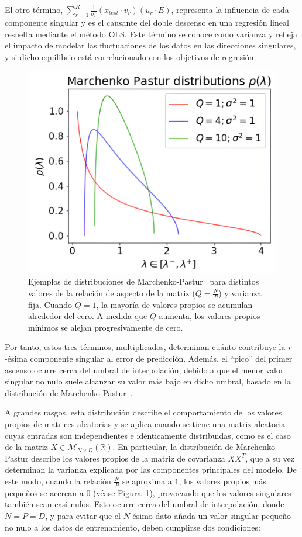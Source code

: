 El otro término, $\sum_{r=1}^{R}\frac{1}{\sigma_r}(x_{test} \cdot v_r)(u_r \cdot E)$, representa la influencia de cada componente singular y es el causante del doble descenso en una regresión lineal resuelta mediante el método OLS. Este término se conoce como varianza y refleja el impacto de modelar las fluctuaciones de los datos en las direcciones singulares, y si dicho equilibrio está correlacionado con los objetivos de regresión.

\begin{figure}[h]
    \centering
    \includegraphics[width=0.5\linewidth]{img/marchenku-pastor.png}
    \caption[Ejemplos de distribuciones de Marchenko-Pastur~\cite{Charles2018}.]{Ejemplos de distribuciones de Marchenko-Pastur~\cite{Charles2018} para distintos valores de la relación de aspecto de la matriz ($Q = \frac{N}{P}$) y varianza fija. Cuando $Q = 1$, la mayoría de valores propios se acumulan alrededor del cero. A medida que $Q$ aumenta, los valores propios mínimos se alejan progresivamente de cero.}\label{fig:marchenkopastur}
\end{figure}

Por tanto, estos tres términos, multiplicados, determinan cuánto contribuye la $r$-ésima componente singular al error de predicción. Además, el ``pico'' del primer ascenso ocurre cerca del umbral de interpolación, debido a que el menor valor singular no nulo suele alcanzar su valor más bajo en dicho umbral, basado en la distribución de Marchenko-Pastur~\cite{Marchenko1967}.

A grandes rasgos, esta distribución describe el comportamiento de los valores propios de matrices aleatorias y se aplica cuando se tiene una matriz aleatoria cuyas entradas son independientes e idénticamente distribuidas, como es el caso de la matriz $X \in \mathcal{M}_{N \times D}(\mathbb{R})$. En particular, la distribución de Marchenko-Pastur describe los valores propios de la matriz de covarianza $XX^{T}$, que a su vez determinan la varianza explicada por las componentes principales del modelo. De este modo, cuando la relación $\frac{N}{P}$ se aproxima a $1$, los valores propios más pequeños se acercan a $0$ (véase Figura~\ref{fig:marchenkopastur}), provocando que los valores singulares también sean casi nulos. Esto ocurre cerca del umbral de interpolación, donde $N = P = D$, y para evitar que el $N$-ésimo dato añada un valor singular pequeño no nulo a los datos de entrenamiento, deben cumplirse dos condiciones: 

